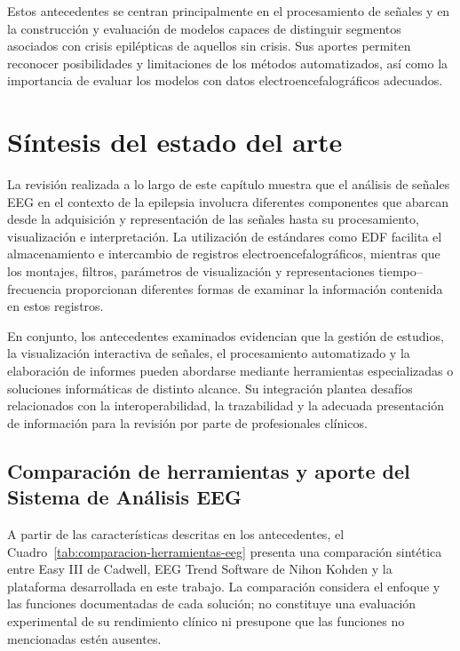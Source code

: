 Estos antecedentes se centran principalmente en el procesamiento de
señales y en la construcción y evaluación de modelos capaces de distinguir
segmentos asociados con crisis epilépticas de aquellos sin crisis. Sus
aportes permiten reconocer posibilidades y limitaciones de los métodos
automatizados, así como la importancia de evaluar los modelos con datos
electroencefalográficos adecuados.

\section{Síntesis del estado del arte}
\label{sec:sintesis-estado-arte}

La revisión realizada a lo largo de este capítulo muestra que el análisis de
señales EEG en el contexto de la epilepsia involucra diferentes componentes
que abarcan desde la adquisición y representación de las señales hasta su
procesamiento, visualización e interpretación. La utilización de estándares
como EDF facilita el almacenamiento e intercambio de registros
electroencefalográficos, mientras que los montajes, filtros, parámetros de
visualización y representaciones tiempo--frecuencia proporcionan diferentes
formas de examinar la información contenida en estos registros.

En conjunto, los antecedentes examinados evidencian que la gestión de
estudios, la visualización interactiva de señales, el procesamiento
automatizado y la elaboración de informes pueden abordarse mediante
herramientas especializadas o soluciones informáticas de distinto alcance.
Su integración plantea desafíos relacionados con la interoperabilidad,
la trazabilidad y la adecuada presentación de información para la revisión
por parte de profesionales clínicos.

\subsection{Comparación de herramientas y aporte del Sistema de Análisis EEG}
\label{subsec:comparacion-herramientas}

A partir de las características descritas en los antecedentes, el
Cuadro~\ref{tab:comparacion-herramientas-eeg} presenta una comparación
sintética entre Easy III de Cadwell, EEG Trend Software de Nihon
Kohden y la plataforma desarrollada en este trabajo. La comparación
considera el enfoque y las funciones documentadas de cada solución;
no constituye una evaluación experimental de su rendimiento clínico
ni presupone que las funciones no mencionadas estén ausentes.

